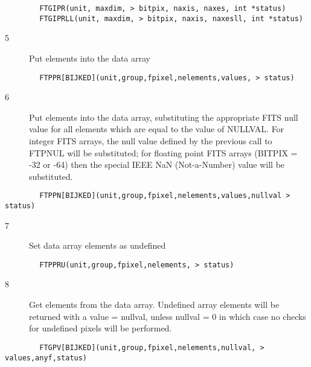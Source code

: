 \documentclass[11pt]{book}
\begin{document}
\begin{verbatim}
        FTGIPR(unit, maxdim, > bitpix, naxis, naxes, int *status)
        FTGIPRLL(unit, maxdim, > bitpix, naxis, naxesll, int *status)
\end{verbatim}

\begin{description}
\item[5 ]Put elements into the data array
\end{description}

\begin{verbatim}
        FTPPR[BIJKED](unit,group,fpixel,nelements,values, > status)
\end{verbatim}

\begin{description}
\item[6 ]Put elements into the data array, substituting the appropriate FITS null
   value for all elements which are equal to the value of NULLVAL.  For
   integer FITS arrays, the null value defined by the previous call to FTPNUL
   will be substituted;  for floating point FITS arrays (BITPIX = -32
   or -64) then the special IEEE NaN (Not-a-Number) value will be
  substituted.
\end{description}

\begin{verbatim}
        FTPPN[BIJKED](unit,group,fpixel,nelements,values,nullval > status)
\end{verbatim}

\begin{description}
\item[7 ]Set data array elements as undefined
\end{description}

\begin{verbatim}
        FTPPRU(unit,group,fpixel,nelements, > status)
\end{verbatim}

\begin{description}
\item[8 ] Get elements from the data array.  Undefined array elements will be
    returned with a value = nullval, unless nullval = 0 in which case no
   checks for undefined pixels will be performed.
\end{description}

\begin{verbatim}
        FTGPV[BIJKED](unit,group,fpixel,nelements,nullval, > values,anyf,status)
\end{verbatim}
\end{document}

